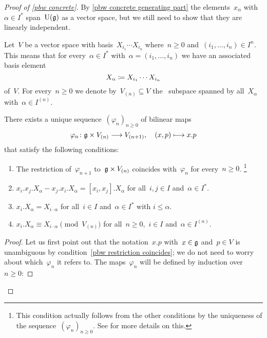 \begin{proof}[Proof of \cref{pbw concrete}]
  By \cref{pbw concrete generating part} the elements~$x_\alpha$ with~$\alpha \in I^*$ span~$\operatorname{U}(\mathfrak{g})$ as a vector space, but we still need to show that they are linearly independent.
  
  Let~$V$ be a vector space with basis~$X_{i_1} \dotsm X_{i_n}$ where~$n \geq 0$ and~$(i_1, \dotsc, i_n) \in I^n$.
  This means that for every~$\alpha \in I^*$ with~$\alpha = (i_1, \dotsc, i_n)$ we have an associated basis element
  \[
    X_\alpha
    \coloneqq
    X_{i_1} \dotsm X_{i_n}
  \]
  of~$V$.
  For every~$n \geq 0$ we denote by~$V_{(n)} \subseteq V$ the~{\linear{$\kf$}} subspace spanned by all~$X_\alpha$ with~$\alpha \in I^{(n)}$.

  \begin{claim*}
    There exists a unique sequence~$(\varphi_n)_{n \geq 0}$ of bilinear maps
    \[
      \varphi_n
      \colon
      \glie \times V_{(n)}
      \to
      V_{(n+1)},
      \quad
      (x,p)
      \mapsto
      x.p
    \]
    that satisfy the following conditions:
    \begin{enumerate}
    \item
      \label{pbw restriction coincides}
      The restriction of~$\varphi_{n+1}$ to~$\mathfrak{g} \times V_{(n)}$ coincides with~$\varphi_n$ for every~$n \geq 0$.%
      \footnote{This condition actually follows from the other conditions by the uniqueness of the sequence~$(\varphi_n)_{n \geq 0}$.
    See \cite[\S 17.4]{humphreys} for more details on this.}
    \item
      \label{pbw representation of lie algebra}
      $x_i.x_j.X_\alpha - x_j.x_i.X_\alpha = [x_i, x_j].X_\alpha$ for all~$i,j \in I$ and~$\alpha \in I^*$.
    \item
      \label{pbw essential condition}
      $x_i.X_\alpha = X_{i \cdot \alpha}$ for all~$i \in I$ and~$\alpha \in I^*$ with $i \leq \alpha$.
    \item
      \label{pbw technical detail for construction}
      $x_i.X_\alpha \equiv X_{i \cdot \alpha} \pmod{V_{(n)}}$ for all~$n \geq 0$,~$i \in I$ and~$\alpha \in I^{(n)}$.
    \end{enumerate}
 \end{claim*}

  \begin{proof}
    Let us first point out that the notation~$x.p$ with~$x \in \mathfrak{g}$ and~$p \in V$ is unambiguous by condition~\ref{pbw restriction coincides};
    we do not need to worry about which~$\varphi_n$ it refers to.
    The maps~$\varphi_n$ will be defined by induction over~$n \geq 0$:
    

\end{proof}
\end{proof}
